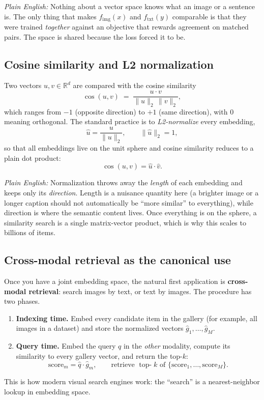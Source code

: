 \documentclass[11pt]{article}
\newcommand{\R}{\mathbb{R}}
\theoremstyle{remark}
\newcommand{\fimg}{f_{\text{img}}}
\newcommand{\ftxt}{f_{\text{txt}}}
\newcommand{\plain}[1]{\medskip\noindent\textit{Plain English:} #1\medskip}
\begin{document}
\plain{Nothing about a vector space knows what an image or a sentence is. The only thing that makes $\fimg(x)$ and $\ftxt(y)$ comparable is that they were trained \emph{together} against an objective that rewards agreement on matched pairs. The space is shared because the loss forced it to be.}

\subsection{Cosine similarity and L2 normalization}
Two vectors $u, v \in \R^d$ are compared with the cosine similarity
\begin{equation}
\cos(u, v) \;=\; \frac{u \cdot v}{\|u\|_2 \, \|v\|_2},
\label{eq:cosine}
\end{equation}
which ranges from $-1$ (opposite direction) to $+1$ (same direction), with $0$ meaning orthogonal. The standard practice is to \emph{L2-normalize} every embedding,
\[
\hat{u} = \frac{u}{\|u\|_2}, \qquad \|\hat{u}\|_2 = 1,
\]
so that all embeddings live on the unit sphere and cosine similarity reduces to a plain dot product:
\[
\cos(u,v) = \hat{u} \cdot \hat{v}.
\]

\plain{Normalization throws away the \emph{length} of each embedding and keeps only its \emph{direction}. Length is a nuisance quantity here (a brighter image or a longer caption should not automatically be ``more similar'' to everything), while direction is where the semantic content lives. Once everything is on the sphere, a similarity search is a single matrix-vector product, which is why this scales to billions of items.}

\subsection{Cross-modal retrieval as the canonical use}
Once you have a joint embedding space, the natural first application is \textbf{cross-modal retrieval}: search images by text, or text by images. The procedure has two phases.
\begin{enumerate}[leftmargin=1.6em]
  \item \textbf{Indexing time.} Embed every candidate item in the gallery (for example, all images in a dataset) and store the normalized vectors $\hat{g}_1, \dots, \hat{g}_M$.
  \item \textbf{Query time.} Embed the query $q$ in the \emph{other} modality, compute its similarity to every gallery vector, and return the top-$k$:
  \[
  \text{score}_m = \hat{q} \cdot \hat{g}_m, \qquad
  \text{retrieve } \operatorname{top-}k \text{ of } \{\text{score}_1, \dots, \text{score}_M\}.
  \]
\end{enumerate}
This is how modern visual search engines work: the ``search'' is a nearest-neighbor lookup in embedding space.
\end{document}
